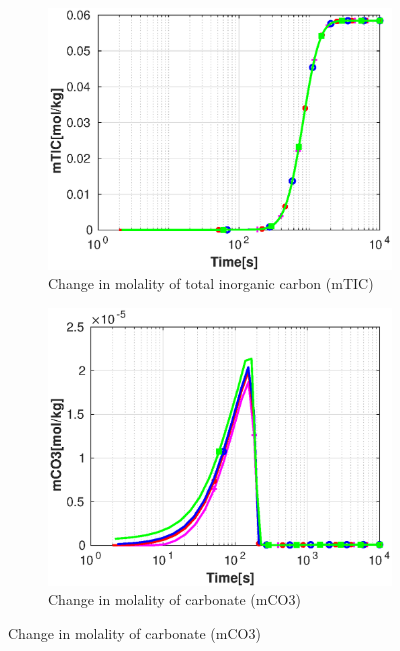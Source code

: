 \begin{figure}[!h]
    \hfill
    \begin{subfigure}{.5\linewidth}
            \centering
        \includegraphics[width=\textwidth]{PICTURES/with_pH_mTIC.eps}
        \caption{Change in molality of total inorganic carbon (mTIC)}
        \label{fig:pHmTIC}
    \end{subfigure}%
    \hfill
    \begin{subfigure}{.5\linewidth}
            \centering
        \includegraphics[width=\textwidth]{PICTURES/with_pH_mCO3.eps}
        \caption{Change in molality of carbonate (mCO3)}
        \label{fig:pHmCO3}
    \end{subfigure}%

\end{figure}
